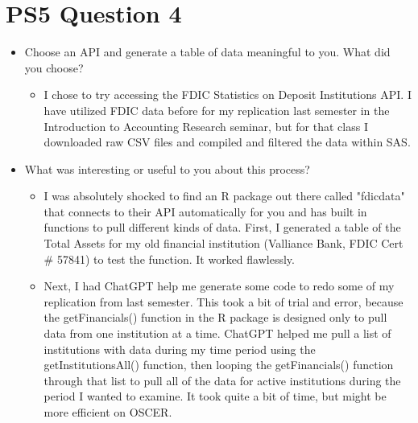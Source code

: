 \documentclass{article}
\begin{document}
\section*{PS5 Question 4}
    \begin{itemize}[label=\bullet]
        \item Choose an API and generate a table of data meaningful to you. What did you choose?
        \begin{itemize}[label=\diamond]
            \item I chose to try accessing the FDIC Statistics on Deposit Institutions API. I have utilized FDIC data before for my replication last semester in the Introduction to Accounting Research seminar, but for that class I downloaded raw CSV files and compiled and filtered the data within SAS. 
        \end{itemize}
        \item What was interesting or useful to you about this process?
        \begin{itemize}[label=\diamond]
            \item I was absolutely shocked to find an R package out there called "fdicdata" that connects to their API automatically for you and has built in functions to pull different kinds of data. First, I generated a table of the Total Assets for my old financial institution (Valliance Bank, FDIC Cert # 57841) to test the function. It worked flawlessly. 
            \item Next, I had ChatGPT help me generate some code to redo some of my replication from last semester. This took a bit of trial and error, because the getFinancials() function in the R package is designed only to pull data from one institution at a time. ChatGPT helped me pull a list of institutions with data during my time period using the getInstitutionsAll() function, then looping the getFinancials() function through that list to pull all of the data for active institutions during the period I wanted to examine. It took quite a bit of time, but might be more efficient on OSCER. 
        \end{itemize}
    \end{itemize}
\end{document}
